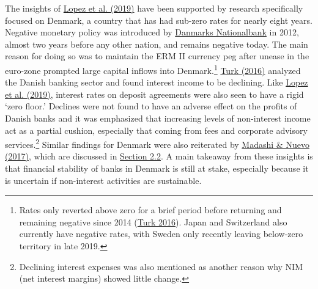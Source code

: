 \documentclass[10pt]{article} %
\begin{document}
The insights of \hyperlink{Lopez}{Lopez et al. (2019)} have been supported by research specifically focused on Denmark, a country that has had sub-zero rates for nearly eight  years. Negative monetary policy was introduced by \href{https://www.nationalbanken.dk/en/Pages/Default.aspx}{Danmarks Nationalbank} in 2012, almost two years before any other nation, and remains negative today. The main reason for doing so was to maintain the ERM II currency peg after unease in the euro-zone prompted large capital inflows into Denmark.\footnote{Rates only reverted above zero for a brief period before returning and remaining negative since 2014 (\hyperlink{Turk}{Turk 2016}). Japan and Switzerland also currently have negative rates, with Sweden only recently leaving below-zero territory in late 2019.} \hyperlink{Turk}{Turk (2016)} analyzed the Danish banking sector and found interest income to be declining.  Like \hyperlink{Lopez}{Lopez et al. (2019)}, interest rates on deposit agreements were also seen to have a rigid `zero floor.' Declines were not found to have an adverse effect on the profits of Danish banks and it was emphasized that increasing levels of non-interest income act as a partial cushion, especially that coming from fees and corporate advisory services.\footnote{Declining interest expenses was also mentioned as another reason why NIM (net interest margins) showed little change.} Similar findings for Denmark were also reiterated by \hyperlink{Madashi}{Madashi \& Nuevo (2017)}, which are discussed in \hyperlink{Denmark Literature}{Section 2.2}. A main takeaway from these insights is that financial stability of banks in Denmark is still at stake, especially because it is uncertain if non-interest activities are sustainable.
\end{document}
